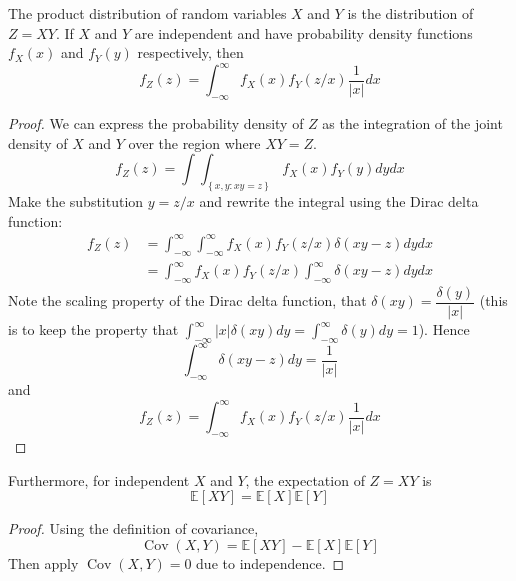 \documentclass[11pt]{report} %
\begin{document}
The product distribution of random variables $X$ and $Y$ is the distribution of $Z = XY$. If $X$ and $Y$ are independent and have probability density functions $f_{X}\left(x\right)$ and $f_{Y}\left(y\right)$ respectively, then
\begin{equation}
f_{Z}\left(z\right) = \int_{-\infty}^{\infty}f_{X}\left(x\right)f_{Y}\left(z/x\right)\dfrac{1}{\left|x\right|}dx
\end{equation}
\begin{proof}
We can express the probability density of $Z$ as the integration of the joint density of $X$ and $Y$ over the region where $XY = Z$.
\begin{equation}
f_{Z}\left(z\right) = \int\int_{\left\{x, y: xy = z\right\}}f_{X}\left(x\right)f_{Y}\left(y\right)dydx
\end{equation}
Make the substitution $y = z/x$ and rewrite the integral using the Dirac delta function:
\begin{align}
f_{Z}\left(z\right) &= \int_{-\infty}^{\infty}\int_{-\infty}^{\infty}f_{X}\left(x\right)f_{Y}\left(z/x\right)\delta\left(xy - z\right)dydx \\
&= \int_{-\infty}^{\infty}f_{X}\left(x\right)f_{Y}\left(z/x\right)\int_{-\infty}^{\infty}\delta\left(xy - z\right)dydx
\end{align}
Note the scaling property of the Dirac delta function, that $\delta\left(xy\right) = \dfrac{\delta\left(y\right)}{\left|x\right|}$ (this is to keep the property that $\int_{-\infty}^{\infty}\left|x\right|\delta\left(xy\right)dy = \int_{-\infty}^{\infty}\delta\left(y\right)dy = 1$). Hence
\begin{equation}
\int_{-\infty}^{\infty}\delta\left(xy - z\right)dy = \dfrac{1}{\left|x\right|}
\end{equation}
and
\begin{equation}
f_{Z}\left(z\right) = \int_{-\infty}^{\infty}f_{X}\left(x\right)f_{Y}\left(z/x\right)\dfrac{1}{\left|x\right|}dx
\end{equation}
\end{proof}

Furthermore, for independent $X$ and $Y$, the expectation of $Z = XY$ is
\begin{equation}
\mathbb{E}\left[XY\right] = \mathbb{E}\left[X\right]\mathbb{E}\left[Y\right]
\end{equation}
\begin{proof}
Using the definition of covariance,
\begin{equation}
\operatorname{Cov}\left(X, Y\right) = \mathbb{E}\left[XY\right] - \mathbb{E}\left[X\right]\mathbb{E}\left[Y\right]
\end{equation}
Then apply $\operatorname{Cov}\left(X, Y\right) = 0$ due to independence.
\end{proof}
\end{document}
